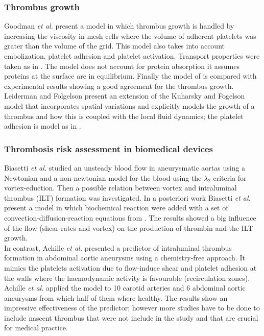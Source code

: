 \documentclass[%
 nofootinbib,
 amsmath,amssymb,
 aps,
 pra,
]{revtex4-1}
\begin{document}
\subsubsection{Thrombus growth}
Goodman \textit{et al.} \citep{Goodman:2005} present a model in which thrombus growth is handled by increasing the viscosity in mesh cells where the volume of adherent platelets was grater than the volume of the grid. This model also takes into account embolization, platelet adhesion and platelet activation. Transport properties were taken as in \citep{Wootton:2002}. The model does not account for protein absorption it assumes proteins at the surface are in equilibrium. Finally the model of \citet{Goodman:2005} is compared with experimental results showing a good agreement for the thrombus growth.\\
Leiderman and Folgelson \citep{Leiderman:2011} present an extension of the Kuharsky and Fogelson \citep{Kuharsky:2001} model that incorporates spatial variations and explicitly models the growth of a thrombus and how this is coupled with the local fluid dynamics; the platelet adhesion is model as in \citet{Fogelson:2004}.\\

\subsubsection{Thrombosis risk assessment in biomedical devices}
Biasetti \textit{et al.} \citep{Biasetti:2011} studied an unsteady blood flow in aneurysmatic aortas using a Newtonian and a non newtonian model for the blood using the $\lambda_{2}$ criteria for vortex-eduction. Then a possible relation between vortex and intraluminal thrombus (ILT) formation was investigated. In a posteriori work Biasetti \textit{et al.} \citep{Biasetti:2012} present a model in which biochemical reaction were added with a set of convection-diffusion-reaction equations from \citep{Jones:1994}. The results showed a big influence of the flow (shear rates and vortex) on the production of thrombin and the ILT growth.\\
In contrast, Achille \textit{et al.} \citep{Achille:2014} presented a predictor of intraluminal thrombus formation in abdominal aortic aneurysms using a chemistry-free approach. It mimics the platelets activation due to flow-induce shear and platelet adhesion at the walls where the haemodynamic activity is favourable (recirculation zones). Achille \textit{et al.} applied the model to 10 carotid arteries and 6 abdominal aortic aneurysms from which half of them where healthy. The results show an impressive effectiveness of the predictor; however more studies have to be done to include nascent thrombus that were not include in the study and that are crucial for medical practice.\\
\end{document}
